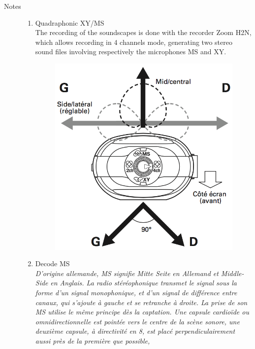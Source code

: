 \begin{description}
\item[Notes] \hfill 
\label{mp:msxy}
\begin{enumerate}
\item Quadraphonic XY/MS\\
The recording of the soundscapes is done with the recorder Zoom H2N, which allows recording in 4 channels mode, generating two stereo sound files involving respectively the microphones MS and XY.
 \begin{figure}[H]
\begin{center}
\includegraphics[scale=0.23]{mp/img/H2N.png}
\end{center}
\end{figure}
\item Decode MS\\
\textit{D'origine allemande, MS signifie} \textsl{Mitte Seite} \textit{en Allemand et} \textsl{Middle-Side} \textit{en Anglais.
La radio st\'{e}r\'{e}ophonique transmet le signal sous la forme d'un signal monophonique, et d'un signal de diff\'{e}rence entre canaux, qui s'ajoute \`{a} gauche et se retranche \`{a} droite. La prise de son MS utilise le m\^{e}me principe d\`{e}s la captation. Une capsule cardio\"{i}de ou omnidirectionnelle est point\'{e}e vers le centre de la sc\`{e}ne sonore, une deuxi\`{e}me capsule, \`{a} directivit\'{e} en 8, est plac\'{e} perpendiculairement aussi pr\`{e}s de la premi\`{e}re que possible,
}
\end{enumerate}
\end{description}
